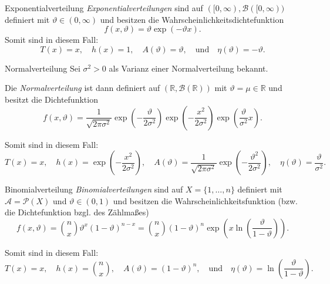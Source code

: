 \begin{example}{Exponentialverteilung}
    \emph{Exponentialverteilungen} sind auf $([0, \infty), \mathcal{B}([0, \infty))$ definiert mit $\vartheta \in (0, \infty)$ und besitzen die Wahrscheinlichkeitsdichtefunktion
    \[
        f(x, \vartheta) = \vartheta \exp(-\vartheta x).
    \]
    Somit sind in diesem Fall:
    \[
        T(x) = x, \quad h(x) = 1, \quad A(\vartheta) = \vartheta, \quad \text{und} \quad \eta(\vartheta) = -\vartheta.
    \]
\end{example}

\begin{example}{Normalverteilung}
    Sei $\sigma^2 > 0$ als Varianz einer Normalverteilung bekannt.

    Die \emph{Normalverteilung} ist dann definiert auf $(\mathbb{R}, \mathcal{B}(\mathbb{R}))$ mit $\vartheta = \mu \in \mathbb{R}$ und besitzt die Dichtefunktion
    \[
        f(x, \vartheta) = \frac{1}{\sqrt{2 \pi \sigma^2}} \exp\left( -\frac{\vartheta}{2 \sigma^2} \right) \exp\left( -\frac{x^2}{2 \sigma^2} \right) \exp\left( \frac{\vartheta}{\sigma^2}x \right).
    \]

    Somit sind in diesem Fall:
    \[
        T(x) = x, \quad h(x) = \exp\left( -\frac{x^2}{2 \sigma^2} \right), \quad A(\vartheta) = \frac{1}{\sqrt{2 \pi \sigma^2}} \exp\left( -\frac{\vartheta^2}{2 \sigma^2} \right), \quad \eta(\vartheta) = \frac{\vartheta}{\sigma^2}.
    \]
\end{example}

\begin{example}{Binomialverteilung}
    \emph{Binomialverteilungen} sind auf $X = \{ 1, \dotsc, n \}$ definiert mit $\mathcal{A} = \mathcal{P}(X)$ und $\vartheta \in (0, 1)$ und besitzen die Wahrscheinlichkeitsfunktion (bzw. die Dichtefunktion bzgl. des Zählmaßes)
    \[
        f(x, \vartheta) = \binom{n}{x} \vartheta^x (1 - \vartheta)^{n - x} = \binom{n}{x} (1 - \vartheta)^n \exp\left( x \ln\left(\frac{\vartheta}{1 - \vartheta}\right) \right).
    \]

    Somit sind in diesem Fall:
    \[
        T(x) = x, \quad h(x) = \binom{n}{x}, \quad A(\vartheta) = (1 - \vartheta)^n, \quad \text{und} \quad  \eta(\vartheta) = \ln\left(\frac{\vartheta}{1 - \vartheta}\right).
    \]
\end{example}



